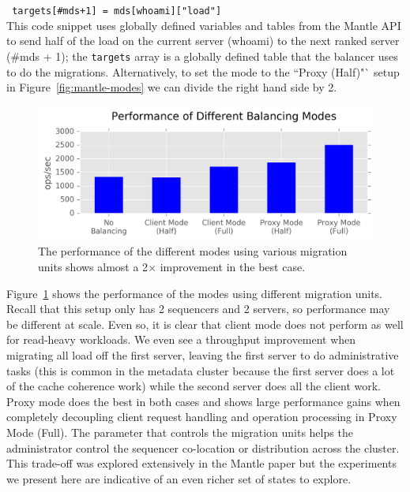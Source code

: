 \documentclass[preprint]{sigplanconf-eurosys}
\begin{document}
\noindent \texttt{ targets[\#mds+1] = mds[whoami]["load"] }\\

This code snippet uses globally defined variables and tables from the Mantle
API to send half of the load on the current server (whoami) to the next ranked
server (\#mds + 1); the \texttt{targets} array is a globally defined table that
the balancer uses to do the migrations. Alternatively, to set the mode to the
``Proxy (Half)"` setup in Figure~\ref{fig:mantle-modes} we can divide the right
hand side by 2.

\begin{figure}[t!]
\centering
\includegraphics{figures/mantle-mode-performance.png}
\caption{The performance of the different modes using various migration units
shows almost a 2\(\times\) improvement in the best case.
}\label{fig:mantle-mode-performance}
\end{figure}

Figure~\ref{fig:mantle-mode-performance} shows the performance of the modes
using different migration units. Recall that this setup only has 2 sequencers
and 2 servers, so performance may be different at scale. Even so, it is clear
that client mode does not perform as well for read-heavy workloads. We even see
a throughput improvement when migrating all load off the first server, leaving
the first server to do administrative tasks (this is common in the metadata
cluster because the first server does a lot of the cache coherence work) while
the second server does all the client work. Proxy mode does the best in both
cases and shows large performance gains when completely decoupling client
request handling and operation processing in Proxy Mode (Full).  The parameter
that controls the migration units helps the administrator control the sequencer
co-location or distribution across the cluster. This trade-off was explored
extensively in the Mantle paper but the experiments we present here are
indicative of an even richer set of states to explore.
\end{document}
